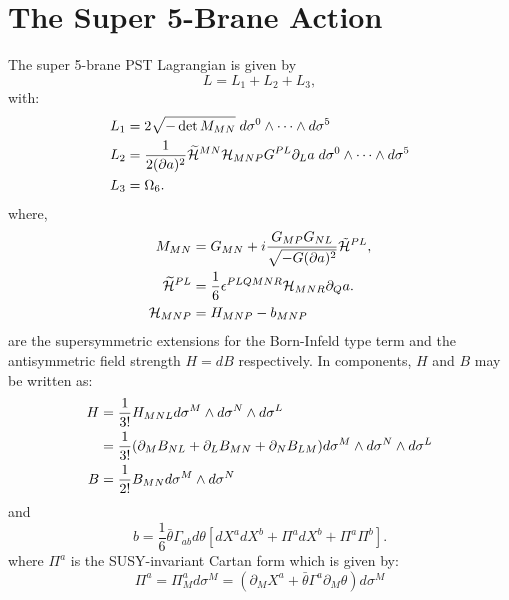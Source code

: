 \documentclass[a4paper,12pt]{article}
\def\CH{\widetilde{\cal{H}}}
\def\btheta{\bar{\theta}}
\begin{document}
\section{\label{super}The Super 5-Brane Action}
The super 5-brane PST Lagrangian is given by
\begin{equation}
L=L_1 + L_2 + L_{3},
\end{equation}
with:
\begin{equation}
\begin{split}
L_1&=2\sqrt{-\det M_{MN}}\; d\sigma^{0}\wedge\cdots\wedge
d\sigma^{5}\\ L_2&={1\over 2(\partial a)^2} {\CH}^{MN}
{\cal{H}}_{MNP} G^{PL}
\partial_L a\;d\sigma^{0}\wedge\cdots\wedge d\sigma^{5}\\ L_3&=
\Omega_6.
\end{split}
\end{equation}
where,
\begin{equation*}
\begin{split}
M_{MN}&= G_{MN} + i {G_{MP} G_{NL}\over\sqrt{-G (\partial a)^2}}
\tilde{\cal H}^{PL},\\
{\CH}^{PL}& = {1\over 6} \epsilon^{PLQMNR} {\cal{H}}_{MNR}
\partial_Q a.\\
{\cal{H}}_{MNP}&=H_{MNP}-b_{MNP}
\end{split}
\end{equation*}
are the  supersymmetric extensions for the Born-Infeld type term
and the antisymmetric field strength $H=dB$ respectively. In
components, $H$ and $B$ may be written as:
\begin{equation*}\label{}
\begin{split}
H&={1\over{3!}}
H_{MNL}d\sigma^{M}\wedge d\sigma^{N}\wedge d\sigma^{L}\\
&={1\over{3!}}(\partial_{M}B_{NL}+\partial_{L}B_{MN}+\partial_{N}B_{LM})
d\sigma^{M}\wedge d\sigma^{N}\wedge d\sigma^{L}\\
B&={1\over{2!}}B_{MN}d\sigma^{M}\wedge d\sigma^{N}
\end{split}
\end{equation*}
and
\begin{equation*}\label{b}
b=\frac{1}{6}\btheta\Gamma_{ab}d\theta[dX^ a dX^ b +\Pi^a dX^b
+\Pi^a \Pi^b].
\end{equation*}
where $\Pi^a$ is the SUSY-invariant Cartan form which is given by:
\begin{equation*}
\Pi^{a}=\Pi^{a}_{M}d\sigma^{M}=(\partial_M
X^{a}+\bar{\theta}\Gamma^{a}\partial_M\theta)d\sigma^M
\end{equation*}
\end{document}
